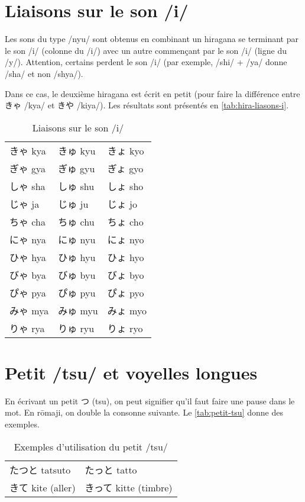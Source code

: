 \documentclass[a4paper,10pt,french,openany]{memoir}
\begin{document}
\section{Liaisons sur le son /i/}

Les sons du type /nyu/ sont obtenus en combinant un hiragana se terminant par le son /i/ (colonne du /i/) avec un autre commençant par le son /i/ (ligne du /y/). Attention, certains perdent le son /i/ (par exemple, /shi/ + /ya/ donne /sha/ et non /shya/).

Dans ce cas, le deuxième hiragana est écrit en petit (pour faire la différence entre きゃ /kya/ et きや /kiya/). Les résultats sont présentés en \autoref{tab:hira-liasons-i}.

\begin{table}[htbp]
 \centering
 \begin{tabular}{lll}
  きゃ kya& きゅ kyu& きょ kyo\\
  ぎゃ gya& ぎゅ gyu& ぎょ gyo\\
  しゃ sha& しゅ shu& しょ sho\\
  じゃ ja & じゅ ju & じょ jo \\
  ちゃ cha& ちゅ chu& ちょ cho\\
  にゃ nya& にゅ nyu& にょ nyo\\
  ひゃ hya& ひゅ hyu& ひょ hyo\\
  びゃ bya& びゅ byu& びょ byo\\
  ぴゃ pya& ぴゅ pyu& ぴょ pyo\\
  みゃ mya& みゅ myu& みょ myo\\
  りゃ rya& りゅ ryu& りょ ryo\\
 \end{tabular}
 \caption{Liaisons sur le son /i/}
 \label{tab:hira-liasons-i}
\end{table}

\section{Petit /tsu/ et voyelles longues}

En écrivant un petit つ (tsu), on peut signifier qu'il faut faire une pause dans le mot. En rōmaji, on double la consonne suivante. Le \autoref{tab:petit-tsu} donne des exemples.

\begin{table}[htbp]
 \centering
 \begin{tabular}{ll}
  たつと tatsuto & たっと tatto \\
  きて kite (aller) & きって kitte (timbre)
 \end{tabular}
 \caption{Exemples d'utilisation du petit /tsu/}
 \label{tab:petit-tsu}
\end{table}
\end{document}
